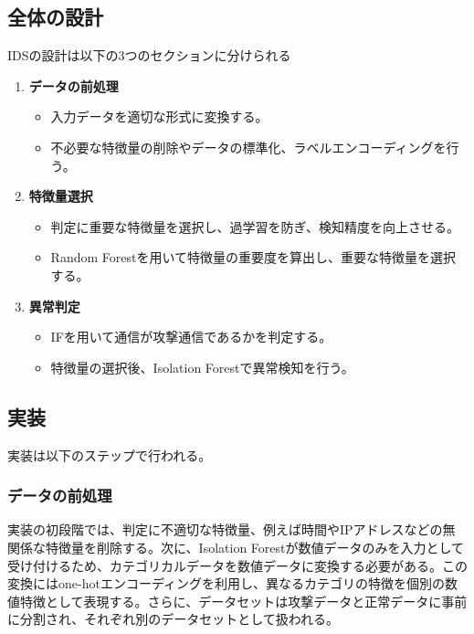 \documentclass{css}
\begin{document}
\subsection{全体の設計}
IDSの設計は以下の3つのセクションに分けられる
\begin{enumerate}
    \item \textbf{データの前処理}
        \begin{itemize}
            \item 入力データを適切な形式に変換する。
            \item 不必要な特徴量の削除やデータの標準化、ラベルエンコーディングを行う。
        \end{itemize}
    \item \textbf{特徴量選択}
        \begin{itemize}
            \item 判定に重要な特徴量を選択し、過学習を防ぎ、検知精度を向上させる。
            \item Random Forestを用いて特徴量の重要度を算出し、重要な特徴量を選択する。
        \end{itemize}
    \item \textbf{異常判定}
        \begin{itemize}
            \item IFを用いて通信が攻撃通信であるかを判定する。
            \item 特徴量の選択後、Isolation Forestで異常検知を行う。
        \end{itemize}
\end{enumerate}

\subsection{実装}

実装は以下のステップで行われる。

\subsubsection{データの前処理}

実装の初段階では、判定に不適切な特徴量、例えば時間やIPアドレスなどの無関係な特徴量を削除する。次に、Isolation Forestが数値データのみを入力として受け付けるため、カテゴリカルデータを数値データに変換する必要がある。この変換にはone-hotエンコーディングを利用し、異なるカテゴリの特徴を個別の数値特徴として表現する。さらに、データセットは攻撃データと正常データに事前に分割され、それぞれ別のデータセットとして扱われる。
\end{document}
